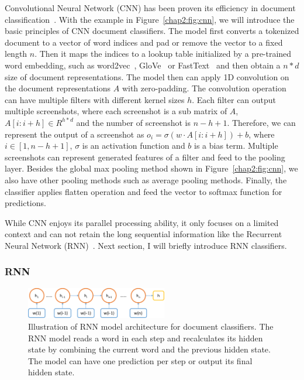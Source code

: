 Convolutional Neural Network (CNN) has been proven its efficiency in document classification~\cite{kim2014convolutional}. 
With the example in Figure~\ref{chap2:fig:cnn}, we will introduce the basic principles of CNN document classifiers.
The model first converts a tokenized document to a vector of word indices and pad or remove the vector to a fixed length $n$. 
Then it maps the indices to a lookup table initialized by a pre-trained word embedding, such as word2vec~\cite{mikolov2013distributed}, GloVe~\cite{pennington2014glove} or FastText~\cite{bojanowski2017enriching} and then obtain a $n*d$ size of document representations.
The model then can apply 1D convolution on the document representations $A$ with zero-padding.
The convolution operation can have multiple filters with different kernel sizes $h$.
Each filter can output multiple screenshots, where each screenshot is a sub matrix of $A$, $A[i: i+h] \in R^{h*d}$ and the number of screenshot is $n-h+1$.
Therefore, we can represent the output of a screenshot as $o_i = \sigma(w \cdot A[i:i+h]) + b$, where $i \in [1, n-h+1]$, $\sigma$ is an activation function and $b$ is a bias term.
Multiple screenshots can represent generated features of a filter and feed to the pooling layer.
Besides the global max pooling method shown in Figure~\ref{chap2:fig:cnn}, we also have other pooling methods such as average pooling methods.
Finally, the classifier applies flatten operation and feed the vector to softmax function for predictions.

While CNN enjoys its parallel processing ability, it only focuses on a limited context and can not retain the long sequential information like the Recurrent Neural Network (RNN)~\cite{goodfellow2016deep}. Next section, I will briefly introduce RNN classifiers.


\subsubsection{RNN}

\begin{figure}[htp]
\centering
\includegraphics[width=0.55\textwidth]{images/chapter2/rnn.pdf}
\caption{Illustration of RNN model architecture for document classifiers. The RNN model reads a word in each step and recalculates its hidden state by combining the current word and the previous hidden state. The model can have one prediction per step or output its final hidden state.}
\label{chap2:fig:rnn}
\end{figure}

